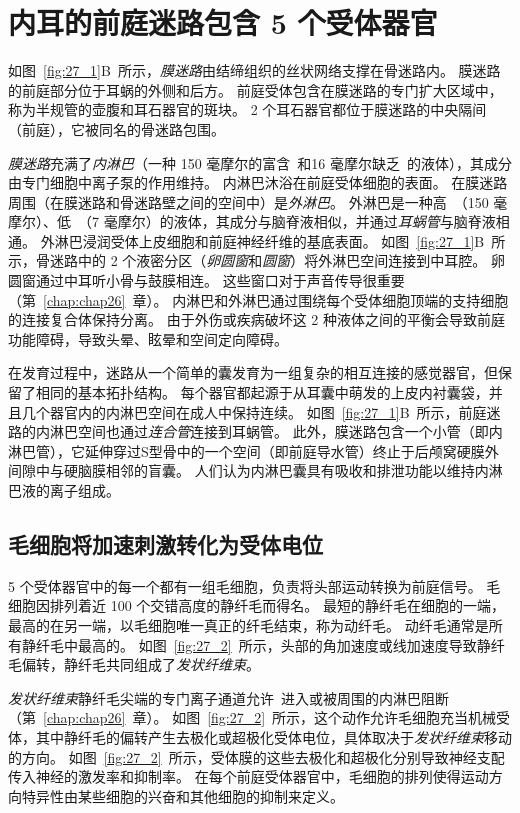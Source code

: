 \section{内耳的前庭迷路包含 5 个受体器官}

如图~\ref{fig:27_1}B~所示，\textit{膜迷路}由结缔组织的丝状网络支撑在骨迷路内。
膜迷路的前庭部分位于耳蜗的外侧和后方。
前庭受体包含在膜迷路的专门扩大区域中，称为半规管的壶腹和耳石器官的斑块。
2 个耳石器官都位于膜迷路的中央隔间（前庭），它被同名的骨迷路包围。


\textit{膜迷路}充满了\textit{内淋巴}（一种 150 毫摩尔的富含~和16 毫摩尔缺乏~的液体），其成分由专门细胞中离子泵的作用维持。
内淋巴沐浴在前庭受体细胞的表面。
在膜迷路周围（在膜迷路和骨迷路壁之间的空间中）是\textit{外淋巴}。
外淋巴是一种高~（150 毫摩尔）、低~（7 毫摩尔）的液体，其成分与脑脊液相似，并通过\textit{耳蜗管}与脑脊液相通。
外淋巴浸润受体上皮细胞和前庭神经纤维的基底表面。
如图~\ref{fig:27_1}B~所示，骨迷路中的 2 个液密分区（\textit{卵圆窗}和\textit{圆窗}）将外淋巴空间连接到中耳腔。
卵圆窗通过中耳听小骨与鼓膜相连。
这些窗口对于声音传导很重要（第~\ref{chap:chap26}~章）。
内淋巴和外淋巴通过围绕每个受体细胞顶端的支持细胞的连接复合体保持分离。
由于外伤或疾病破坏这 2 种液体之间的平衡会导致前庭功能障碍，导致头晕、眩晕和空间定向障碍。


在发育过程中，迷路从一个简单的囊发育为一组复杂的相互连接的感觉器官，但保留了相同的基本拓扑结构。
每个器官都起源于从耳囊中萌发的上皮内衬囊袋，并且几个器官内的内淋巴空间在成人中保持连续。
如图~\ref{fig:27_1}B~所示，前庭迷路的内淋巴空间也通过\textit{连合管}连接到耳蜗管。
此外，膜迷路包含一个小管（即内淋巴管），它延伸穿过S型骨中的一个空间（即前庭导水管）终止于后颅窝硬膜外间隙中与硬脑膜相邻的盲囊。
人们认为内淋巴囊具有吸收和排泄功能以维持内淋巴液的离子组成。


\subsection{毛细胞将加速刺激转化为受体电位}

5 个受体器官中的每一个都有一组毛细胞，负责将头部运动转换为前庭信号。
毛细胞因排列着近 100 个交错高度的静纤毛而得名。
最短的静纤毛在细胞的一端，最高的在另一端，以毛细胞唯一真正的纤毛结束，称为动纤毛。
动纤毛通常是所有静纤毛中最高的。
如图~\ref{fig:27_2}~所示，头部的角加速度或线加速度导致静纤毛偏转，静纤毛共同组成了\textit{发状纤维束}。


\textit{发状纤维束}静纤毛尖端的专门离子通道允许~进入或被周围的内淋巴阻断（第~\ref{chap:chap26}~章）。
如图~\ref{fig:27_2}~所示，这个动作允许毛细胞充当机械受体，其中静纤毛的偏转产生去极化或超极化受体电位，具体取决于\textit{发状纤维束}移动的方向。
如图~\ref{fig:27_2}~所示，受体膜的这些去极化和超极化分别导致神经支配传入神经的激发率和抑制率。
在每个前庭受体器官中，毛细胞的排列使得运动方向特异性由某些细胞的兴奋和其他细胞的抑制来定义。


